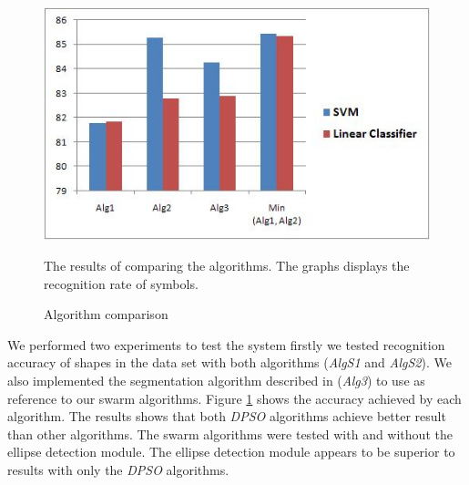 \documentclass[a4paper,10pt]{IEEEconf}
\begin{document}
\begin{figure}[]
	\centering
		\includegraphics[scale=0.5]{images/test1.jpg}
	\caption{Algorithm comparison} The results of comparing the algorithms. The graphs displays the recognition rate of symbols. 
	\label{fig:test1}
\end{figure}
We performed two experiments to test the system firstly we tested recognition accuracy of shapes in the data set with both algorithms (\textsl{AlgS1} and \textsl{AlgS2}). We also implemented the segmentation algorithm described in \cite{earlyprocess} (\textsl{Alg3}) to use as reference to our swarm algorithms.  Figure \ref{fig:test1} shows the accuracy achieved by each algorithm. The results shows that both \textit{DPSO} algorithms achieve better result than other algorithms. The swarm algorithms were tested with and without the ellipse detection module. The ellipse detection module appears to be superior to results with only the \textit{DPSO} algorithms.\\  
\end{document}
